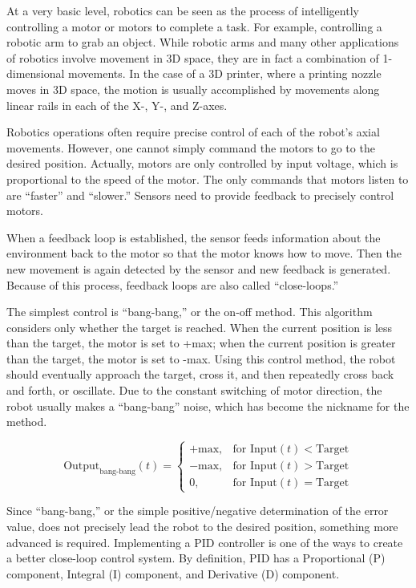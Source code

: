 
At a very basic level, robotics can be seen as the process of intelligently controlling a motor or motors to complete a task. For example, controlling a robotic arm to grab an object. While robotic arms and many other applications of robotics involve movement in 3D space, they are in fact a combination of 1-dimensional movements. In the case of a 3D printer, where a printing nozzle moves in 3D space, the motion is usually accomplished by movements along linear rails in each of the X-, Y-, and Z-axes.

Robotics operations often require precise control of each of the robot’s axial movements. However, one cannot simply command the motors to go to the desired position. Actually, motors are only controlled by input voltage, which is proportional to the speed of the motor. The only commands that motors listen to are “faster” and “slower.” Sensors need to provide feedback to precisely control motors.

When a feedback loop is established, the sensor feeds information about the environment back to the motor so that the motor knows how to move. Then the new movement is again detected by the sensor and new feedback is generated. Because of this process, feedback loops are also called “close-loops.”

The simplest control is “bang-bang,” or the on-off method. This algorithm considers only whether the target is reached. When the current position is less than the target, the motor is set to +max; when the current position is greater than the target, the motor is set to -max. Using this control method, the robot should eventually approach the target, cross it, and then repeatedly cross back and forth, or oscillate. Due to the constant switching of motor direction, the robot usually makes a “bang-bang” noise, which has become the nickname for the method.

\[ \text{Output}_{\text{bang-bang}}(t) = \begin{cases}
    +\text{max}, & \text{for Input}(t) < \text{Target} \\
    -\text{max}, & \text{for Input}(t) > \text{Target} \\
    0, & \text{for Input}(t) = \text{Target}
\end{cases} \]

Since “bang-bang,” or the simple positive/negative determination of the error value, does not precisely lead the robot to the desired position, something more advanced is required. Implementing a PID controller is one of the ways to create a better close-loop control system. By definition, PID has a Proportional (P) component, Integral (I) component, and Derivative (D) component.

